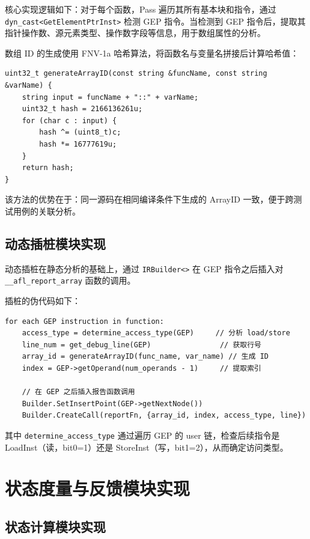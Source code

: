 \documentclass[bachelor]{njupthesis}
\begin{document}
核心实现逻辑如下：对于每个函数，Pass 遍历其所有基本块和指令，通过 \texttt{dyn\_cast<GetElementPtrInst>} 检测 GEP 指令。当检测到 GEP 指令后，提取其指针操作数、源元素类型、操作数字段等信息，用于数组属性的分析。

数组 ID 的生成使用 FNV-1a 哈希算法，将函数名与变量名拼接后计算哈希值：

\begin{verbatim}
uint32_t generateArrayID(const string &funcName, const string &varName) {
    string input = funcName + "::" + varName;
    uint32_t hash = 2166136261u;
    for (char c : input) {
        hash ^= (uint8_t)c;
        hash *= 16777619u;
    }
    return hash;
}
\end{verbatim}

该方法的优势在于：同一源码在相同编译条件下生成的 ArrayID 一致，便于跨测试用例的关联分析。

\subsection{动态插桩模块实现}

动态插桩在静态分析的基础上，通过 \texttt{IRBuilder<>} 在 GEP 指令之后插入对 \texttt{\_\_afl\_report\_array} 函数的调用。

插桩的伪代码如下：

\begin{verbatim}
for each GEP instruction in function:
    access_type = determine_access_type(GEP)     // 分析 load/store
    line_num = get_debug_line(GEP)                // 获取行号
    array_id = generateArrayID(func_name, var_name) // 生成 ID
    index = GEP->getOperand(num_operands - 1)     // 提取索引

    // 在 GEP 之后插入报告函数调用
    Builder.SetInsertPoint(GEP->getNextNode())
    Builder.CreateCall(reportFn, {array_id, index, access_type, line})
\end{verbatim}

其中 \texttt{determine\_access\_type} 通过遍历 GEP 的 user 链，检查后续指令是 LoadInst（读，bit0=1）还是 StoreInst（写，bit1=2），从而确定访问类型。

\section{状态度量与反馈模块实现}

\subsection{状态计算模块实现}
\end{document}
